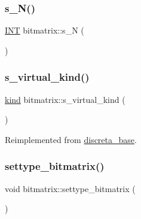 \subsubsection{\texorpdfstring{s\+\_\+\+N()}{s\_N()}}
{\footnotesize\ttfamily \mbox{\hyperlink{galois_8h_a09fddde158a3a20bd2dcadb609de11dc}{I\+NT}} bitmatrix\+::s\+\_\+N (\begin{DoxyParamCaption}{ }\end{DoxyParamCaption})}

\mbox{\label{classbitmatrix_a3e8982cdd7e500a0298a60469b4a5860}} 
\subsubsection{\texorpdfstring{s\+\_\+virtual\+\_\+kind()}{s\_virtual\_kind()}}
{\footnotesize\ttfamily \mbox{\hyperlink{discreta_8h_aaf25ee7e2306d78c74ec7bc48f092e81}{kind}} bitmatrix\+::s\+\_\+virtual\+\_\+kind (\begin{DoxyParamCaption}{ }\end{DoxyParamCaption})\hspace{0.3cm}{\ttfamily [virtual]}}



Reimplemented from \mbox{\hyperlink{classdiscreta__base_a52778a6d6943a468be083d0785d418fb}{discreta\+\_\+base}}.

\mbox{\label{classbitmatrix_acb571d947f9526665ebbdc0ce3e2a973}} 
\subsubsection{\texorpdfstring{settype\+\_\+bitmatrix()}{settype\_bitmatrix()}}
{\footnotesize\ttfamily void bitmatrix\+::settype\+\_\+bitmatrix (\begin{DoxyParamCaption}{ }\end{DoxyParamCaption})}

\mbox{\label{classbitmatrix_a8dd74a0158ac5fbf4c2c6b7a71f9a39f}} 
